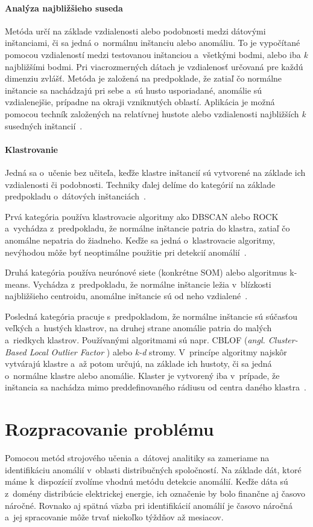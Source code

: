 \documentclass[a4paper,twoside,slovak,12pt]{article}
\begin{document}
\paragraph{Analýza najbližšieho suseda}
Metóda určí na základe vzdialenosti alebo podobnosti medzi dátovými inštanciami,
či sa jedná o~normálnu inštanciu alebo anomáliu. To je vypočítané pomocou
vzdialeností medzi testovanou inštanciou a~všetkými bodmi, alebo iba \textit{k}
najbližšími bodmi. Pri viacrozmerných dátach je vzdialenosť určovaná pre
každú dimenziu zvlášť. Metóda je založená na predpoklade, že zatiaľ čo normálne
inštancie sa nachádzajú pri sebe a~sú husto usporiadané, anomálie sú vzdialenejšie,
prípadne na okraji vzniknutých oblastí. Aplikácia je možná pomocou techník založených
na relatívnej hustote alebo vzdialenosti najbližších \textit{k} susedných
inštancií~\cite{Chandola2009,Tan2005}.

\paragraph{Klastrovanie}
Jedná sa o~učenie bez učiteľa, keďže klastre inštancií sú vytvorené na základe
ich vzdialenosti či podobnosti. Techniky ďalej delíme do kategórií na základe
predpokladu o~dátových inštanciách~\cite{Chandola2009,Tan2005}.

Prvá kategória používa klastrovacie algoritmy ako DBSCAN alebo ROCK
a~vychádza z~predpokladu, že normálne inštancie patria do klastra, zatiaľ čo
anomálne nepatria do žiadneho. Keďže sa jedná o~klastrovacie algoritmy, nevýhodou
môže byť neoptimálne použitie pri detekcií anomálií~\cite{Chandola2009}.

Druhá kategória používa neurónové siete (konkrétne SOM) alebo algoritmus k-means.
Vychádza z~predpokladu, že normálne inštancie ležia v~blízkosti najbližšieho
centroidu, anomálne inštancie sú od neho vzdialené~\cite{Chandola2009}.

Posledná kategória pracuje s~predpokladom, že normálne inštancie sú súčasťou
veľkých a~hustých klastrov, na druhej strane anomálie patria do malých a~riedkych
klastrov. Používanými algoritmami sú napr. CBLOF (\textit{angl. Cluster-Based Local Outlier Factor}
) alebo \textit{k-d} stromy. V~princípe algoritmy najskôr vytvárajú klastre
a~až potom určujú, na základe ich hustoty, či sa jedná o~normálne klastre alebo
anomálie. Klaster je vytvorený iba v~prípade, že inštancia sa nachádza mimo
preddefinovaného rádiusu od centra daného klastra~\cite{Salvador2005}.


\newpage
\section{Rozpracovanie problému}
Pomocou metód strojového učenia a~dátovej analitiky sa zameriame na identifikáciu
anomálií v~oblasti distribučných spoločností. Na základe dát, ktoré máme
k~dispozícií zvolíme vhodnú metódu detekcie anomálií. Keďže dáta sú z~domény
distribúcie elektrickej energie, ich označenie by bolo finančne aj časovo
náročné. Rovnako aj spätná väzba pri identifikácií anomálií je časovo náročná
a~jej spracovanie môže trvať niekoľko týždňov až mesiacov.
\end{document}
